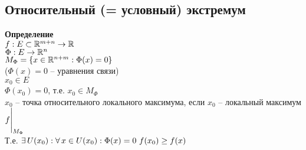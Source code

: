 \documentclass[12pt]{article}
\begin{document}
\subsection{Относительный (= условный) экстремум}
\textbf{Определение}\\
$f: E \subset \mathbb{R}^{m+n} \rightarrow \mathbb{R}$\\
$\Phi: E \rightarrow \mathbb{R}^n$\\
$M_\Phi = \{ x \in \mathbb{R}^{n+m}: \Phi(x) = 0\}$\\
($\Phi(x) = 0$ -- уравнения связи)\\
$x_0 \in E$\\
$\Phi(x_0) = 0$, т.е. $x_0 \in M_\Phi$\\
$x_0$ -- точка относительного локального максимума, если $x_0$ -- локальный максимум $f\Biggr|_{M_\Phi}$\\
Т.е. $\exists\, U(x_0): \forall\, x\in U(x_0): \Phi(x) = 0\ f(x_0) \geq f(x)$\\
\end{document}
